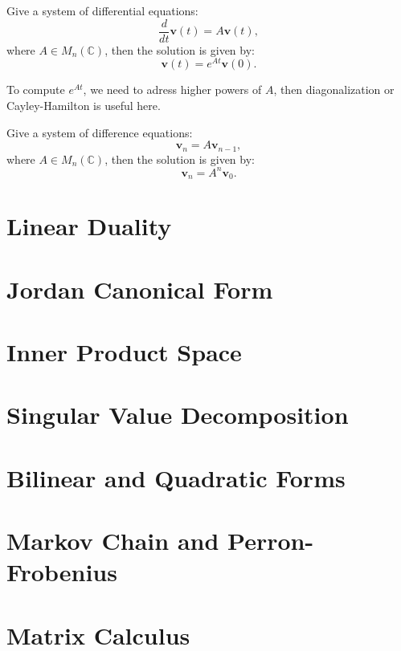 \documentclass[12pt]{article}
\begin{document}
\begin{corollary}
    Give a system of differential equations:
    \[\frac{d}{dt}\mathbf{v}(t)=A\mathbf{v}(t),\]
    where $A\in M_n(\mathbb{C})$, then the solution is given by:
    \[\mathbf{v}(t)=e^{At}\mathbf{v}(0).\]
\end{corollary}

\begin{remark}
    To compute $e^{At}$, we need to adress higher powers of $A$, 
    then diagonalization or Cayley-Hamilton is useful here.
\end{remark}

\begin{exercise}
    Give a system of difference equations:
    \[ \mathbf{v}_n=A \mathbf{v}_{n-1},\]
    where $A\in M_n(\mathbb{C})$, then the solution is given by:
    \[\mathbf{v}_n=A^n \mathbf{v}_{0}.\]
\end{exercise}


\newpage
\section{Linear Duality}


\newpage
\section{Jordan Canonical Form}


\newpage
\section{Inner Product Space}


\newpage
\section{Singular Value Decomposition}


\newpage
\section{Bilinear and Quadratic Forms}


\newpage
\section{Markov Chain and Perron-Frobenius}


\newpage
\section{Matrix Calculus}

\end{document}
